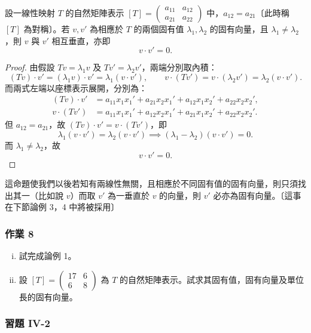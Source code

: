 \begin{proposition}
設一線性映射 $T$ 的自然矩陣表示 $[T] = \begin{pmatrix} a_{11} & a_{12} \\ a_{21} & a_{22} \end{pmatrix}$ 中，$a_{12} = a_{21}$〔此時稱 $[T]$ 為對稱〕。若 $v, v'$ 為相應於 $T$ 的兩個固有值 $\lambda_1, \lambda_2$ 的固有向量，且 $\lambda_1 \ne \lambda_2$，則 $v$ 與 $v'$ 相互垂直，亦即
\[
v \cdot v' = 0.
\]
\end{proposition}

\begin{proof}
由假設 $Tv = \lambda_1 v$ 及 $Tv' = \lambda_2 v'$，兩端分別取內積：
\[
(Tv) \cdot v' = (\lambda_1 v) \cdot v' = \lambda_1 (v \cdot v'), \qquad
v \cdot (Tv') = v \cdot (\lambda_2 v') = \lambda_2 (v \cdot v').
\]
而兩式左端以座標表示展開，分別為：
\[
\begin{aligned}
(Tv) \cdot v' &= a_{11} x_1 x_1' + a_{21} x_2 x_1' + a_{12} x_1 x_2' + a_{22} x_2 x_2', \\
v \cdot (Tv') &= a_{11} x_1 x_1' + a_{12} x_2 x_1' + a_{21} x_1 x_2' + a_{22} x_2 x_2'.
\end{aligned}
\]
但 $a_{12} = a_{21}$，故 $(Tv) \cdot v' = v \cdot (Tv')$，即
\[
\lambda_1 (v \cdot v') = \lambda_2 (v \cdot v') \implies (\lambda_1 - \lambda_2)(v \cdot v') = 0.
\]
而 $\lambda_1 \ne \lambda_2$，故
\[
v \cdot v' = 0.
\]
\end{proof}

這命題使我們以後若知有兩線性無關，且相應於不同固有值的固有向量，則只須找出其一（比如說 $v$）而取 $v'$ 為一垂直於 $v$ 的向量，則 $v'$ 必亦為固有向量。〔這事在下節論例 3，4 中將被採用〕

\subsubsection*{作業 8}
\begin{enumerate}[(i)]
  \item 試完成論例 1。
  \item 設 $[T] = \begin{pmatrix} 17 & 6 \\ 6 & 8 \end{pmatrix}$ 為 $T$ 的自然矩陣表示。試求其固有值，固有向量及單位長的固有向量。
\end{enumerate}

\subsubsection*{習題 IV-2}

